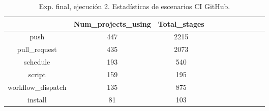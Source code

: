\begin{table}[h]
  \centering
  \caption{Exp. final, ejecución 2. Estadísticas de escenarios CI GitHub.}
  \label{tab:tabla_f2_5}

\begin{footnotesize}
\renewcommand{\arraystretch}{1.5} %
\begin{tabular}{ccccccccccc}
  \hline
  {} &  Num\_projects\_using &  Total\_stages \\
  \hline
  push                        &                 447 &          2215 \\
  pull\_request                &                 435 &          2073 \\
  schedule                    &                 193 &           540 \\
  script                      &                 159 &           195 \\
  workflow\_dispatch           &                 135 &           875 \\
  install                     &                  81 &           103 \\

\end{tabular}
\end{footnotesize}
\end{table}
